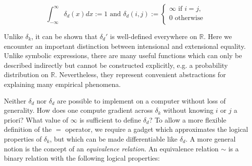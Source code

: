 \documentclass[11pt]{article}
\begin{document}
    $$
    \int_{-\infty}^{\infty} \delta_d (x)dx := 1 \text{ and } \delta_d(i, j) :=
    \begin{cases}
        \infty \text{ if } i = j, \\
        0 \text{ otherwise }\\
    \end{cases}
    $$

    Unlike $\delta_k$, it can be shown that $\delta_d'$ is well-defined everywhere on $\mathbb{R}$. Here we encounter an important distinction between intensional and extensional equality. Unlike symbolic expressions, there are many useful functions which can only be described indirectly but cannot be constructed explicitly, e.g. a probability distribution on $\mathbb{R}$. Nevertheless, they represent convenient abstractions for explaining many empirical phenomena.

    Neither $\delta_d$ nor $\delta_d$ are possible to implement on a computer without loss of generality. How does one compute gradient across $\delta_k$ without knowing $i$ or $j$ a priori? What value of $\infty$ is sufficient to define $\delta_d$? To allow a more flexible definition of the $=$ operator, we require a gadget which approximates the logical properties of $\delta_k$, but which can be made differentiable like $\delta_d$. A more general notion is the concept of an \textit{equivalence relation}. An equivalence relation $\sim$ is a binary relation with the following logical properties:


\end{document}
